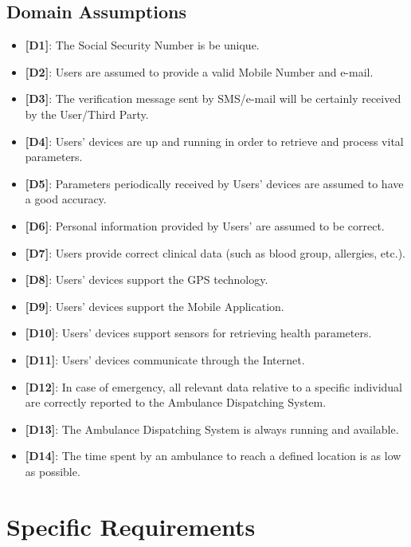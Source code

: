 \documentclass[12pt,a4paper]{article}
\begin{document}
		\subsection{Domain Assumptions}
			\begin{itemize}
				\item {\textbf[}\textbf{D1}{\textbf]}: The Social Security Number is be unique.
				\item {\textbf[}\textbf{D2}{\textbf]}: Users are assumed to provide a valid Mobile Number and e-mail.
				\item {\textbf[}\textbf{D3}{\textbf]}: The verification message sent by SMS/e-mail will be certainly received by the User/Third Party.
				\item {\textbf[}\textbf{D4}{\textbf]}: Users' devices are up and running in order to retrieve and process vital parameters.
				\item {\textbf[}\textbf{D5}{\textbf]}: Parameters periodically received by Users' devices are assumed to have a good accuracy.
				\item {\textbf[}\textbf{D6}{\textbf]}: Personal information provided by Users' are assumed to be correct.
				\item {\textbf[}\textbf{D7}{\textbf]}: Users provide correct clinical data (such as blood group, allergies, etc.).
				\item {\textbf[}\textbf{D8}{\textbf]}: Users' devices support the GPS technology.
				\item {\textbf[}\textbf{D9}{\textbf]}: Users' devices support the Mobile Application.
				\item {\textbf[}\textbf{D10}{\textbf]}: Users' devices support sensors for retrieving health parameters.
				\item {\textbf[}\textbf{D11}{\textbf]}: Users' devices communicate through the Internet.
				\item {\textbf[}\textbf{D12}{\textbf]}: In case of emergency, all relevant data relative to a specific individual are correctly reported to the Ambulance Dispatching System.
				\item {\textbf[}\textbf{D13}{\textbf]}: The Ambulance Dispatching System is always running and available.
				\item {\textbf[}\textbf{D14}{\textbf]}: The time spent by an ambulance to reach a defined location is as low as possible.
			\end{itemize}

	\newpage
	\section{Specific Requirements}
\end{document}
